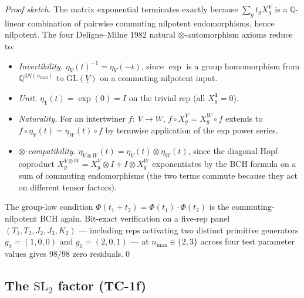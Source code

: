 \documentclass[11pt,a4paper]{article}
\theoremstyle{plain}
\theoremstyle{definition}
\newcommand{\nmax}{n_{\max}}
\newcommand{\GL}{\mathrm{GL}}
\newcommand{\SL}{\mathrm{SL}}
\newcommand{\Q}{\mathbb{Q}}
\newcommand{\Phimap}{\Phi}
\begin{document}
\begin{proof}[Proof sketch]
The matrix exponential terminates exactly because $\sum_{g} t_{g}
X_{g}^{V}$ is a $\Q$-linear combination of pairwise commuting
nilpotent endomorphisms, hence nilpotent. The four Deligne--Milne
1982 natural $\otimes$-automorphism axioms reduce to:

\begin{itemize}
\item \emph{Invertibility.} $\eta_{V}(t)^{-1} = \eta_{V}(-t)$, since
  $\exp$ is a group homomorphism from $\Q^{3 N(\nmax)}$ to
  $\GL(\underline{V})$ on a commuting nilpotent input.
\item \emph{Unit.} $\eta_{\mathbf{1}}(t) = \exp(0) = I$ on the trivial
  rep (all $X_{g}^{\mathbf{1}} = 0$).
\item \emph{Naturality.} For an intertwiner $f :\ V \to W$,
  $f \circ X_{g}^{V} = X_{g}^{W} \circ f$ extends to $f \circ \eta_{V}(t)
  = \eta_{W}(t) \circ f$ by termwise application of the exp power
  series.
\item \emph{$\otimes$-compatibility.} $\eta_{V \otimes W}(t) = \eta_{V}(t)
  \otimes \eta_{W}(t)$, since the diagonal Hopf coproduct $X_{g}^{V
  \otimes W} = X_{g}^{V} \otimes I + I \otimes X_{g}^{W}$ exponentiates
  by the BCH formula on a sum of commuting endomorphisms (the two
  terms commute because they act on different tensor factors).
\end{itemize}

The group-law condition $\Phimap(t_{1} + t_{2}) = \Phimap(t_{1})
\cdot \Phimap(t_{2})$ is the commuting-nilpotent BCH again.
Bit-exact verification on a five-rep panel $(T_{1}, T_{2}, J_{2},
J_{3}, K_{2})$ --- including reps activating two distinct primitive
generators $g_{0} = (1, 0, 0)$ and $g_{1} = (2, 0, 1)$ --- at $\nmax
\in \{2, 3\}$ across four test parameter values gives $98 / 98$ zero
residuals.\qed
\end{proof}

\subsection{The $\SL_{2}$ factor (TC-1f)}\label{sec:sl2_explicit}
\end{document}
